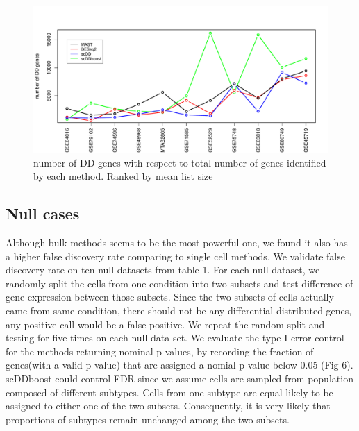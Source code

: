 \documentclass[aoas,preprint]{imsart}
\begin{document}
\begin{figure}[H]
\includegraphics[width = 1\textwidth]{Figs/DD95.pdf}
 \caption{ number of DD genes with respect to total number of genes identified by each method. Ranked by mean list size}
  \label{fig:6}
\end{figure}




\subsection{Null cases}

Although bulk methods seems to be the most powerful one, we found it also has a higher false discovery rate comparing to single cell methods. We validate false discovery rate on ten null datasets from table 1. For each null dataset, we randomly split the cells from one condition into two subsets and test difference of gene expression between those subsets. Since the two subsets of cells actually came from same condition, there should not be any differential distributed genes, any positive call would be a false positive. We repeat the random split and testing for five times on each null data set. We evaluate the type I error control for the methods returning nominal p-values, by recording the fraction of genes(with a valid p-value) that are assigned a nomial p-value below 0.05 (Fig 6).\\
scDDboost could control FDR since we assume cells are sampled from population composed of different subtypes. Cells from one subtype are equal likely to be assigned to either one of the two subsets. Consequently, it is very likely that proportions of subtypes remain unchanged among the two subsets.
\end{document}
